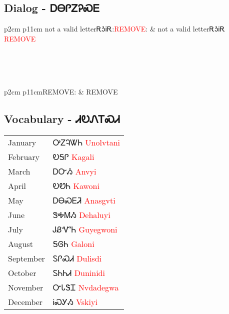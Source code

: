\newpage\subsection{Dialog - ᎠᎾᎵᏃᎮᏍᎬ}
\begin{tabular}{p{2cm} p{11cm}}
not a valid letterᎡᎼᎥᎡ:\newline \textcolor{red}{REMOVE}: & not a valid letterᎡᎼᎥᎡ 
\newline\textcolor{red}{REMOVE}\\
\end{tabular}
\\
\\
\\
\noindent\begin{tabular}{p{2cm} p{11cm}}REMOVE: & REMOVE\\
\end{tabular}
\vfill\newpage\subsection{Vocabulary - ᏗᎧᏁᎢᏍᏗ 
}
\begin{minipage}{\linewidth}
\begin{tabular}{p{3cm} p{11cm}}
January & ᎤᏃᎸᏔᏂ 
 \newline \textcolor{red}{Unolvtani}\\
February & ᎧᎦᎵ 
 \newline \textcolor{red}{Kagali}\\
March & ᎠᏅᏱ 
 \newline \textcolor{red}{Anvyi}\\
April & ᎧᏬᏂ 
 \newline \textcolor{red}{Kawoni}\\
May & ᎠᎾᏍᎬᏘ 
 \newline \textcolor{red}{Anasgvti}\\
June & ᏕᎭᎷᏱ 
 \newline \textcolor{red}{Dehaluyi}\\
July & ᎫᏰᏉᏂ 
 \newline \textcolor{red}{Guyegwoni}\\
August & ᎦᎶᏂ 
 \newline \textcolor{red}{Galoni}\\
September & ᏚᎵᏍᏗ 
 \newline \textcolor{red}{Dulisdi}\\
October & ᏚᏂᏂᏗ 
 \newline \textcolor{red}{Duninidi}\\
November & ᏅᏓᏕᏆ 
 \newline \textcolor{red}{Nvdadegwa}\\
December & ᎥᏍᎩᏱ 
 \newline \textcolor{red}{Vskiyi}\\
\end{tabular}
\end{minipage}

